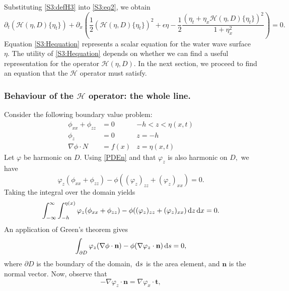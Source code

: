 \documentclass[11pt,reqno,oneside,a4paper]{article}
\begin{document}
Substituting \eqref{S3:defH3} into \eqref{S3:eq2}, we obtain 
\begin{equation}\label{S3:Hequation}
\partial_t\left(\mathcal{H}(\eta, D)\{ \eta_t\} \right) + \partial_x\left( \frac{1}{2}\left(\mathcal{H}(\eta, D)\{\eta_t\} \right)^2 + \epsilon \eta - \frac{1}{2} \frac{(\eta_t + \eta_x \mathcal{H}(\eta, D)\{ \eta_t\})^2}{1+\eta_x^2}\right) = 0.
\end{equation}
Equation \eqref{S3:Hequation} represents a scalar equation for the water wave surface $\eta.$ The utility of \eqref{S3:Hequation} depends on whether we can find a useful representation for the operator $\mathcal{H}(\eta, D).$ In the next section, we proceed to find an equation that the $\mathcal{H}$ operator must satisfy. 

\subsubsection{Behaviour of the $\mathcal{H}$ operator: the whole line.}
Consider the following boundary value problem:
\begin{subequations}
\begin{align}
\phi_{xx} + \phi_{zz} &= 0 &-h < z < \eta(x,t) \label{S3:PDE1}\\
\phi_{z} &= 0 &z = -h \label{S3:BBC}\\
\nabla  \phi \cdot N &= f(x )& z = \eta(x,t) \label{S3:KBC}
\end{align}
\end{subequations}
Let $\varphi$ be harmonic on $D.$ Using \eqref{PDEn} and that $\varphi_z$ is also harmonic on $D,$ we have
\[ \varphi_z(\phi_{xx} + \phi_{zz}) - \phi((\varphi_z)_{zz} + (\varphi_{z})_{xx}) = 0. \]
Taking the integral over the domain yields
\[ \int^{\infty}_{-\infty} \int^{\eta(x)}_{-h} \varphi_z(\phi_{xx} + \phi_{zz}) - \phi((\varphi_z)_{zz} + (\varphi_{z})_{xx}) \,\mathrm{d} z \,\mathrm{d} x = 0.\]
An application of Green's theorem gives 
\begin{equation}\label{S3:dInt}
\int_{\partial D} \varphi_z(\nabla  \phi \cdot \textbf{n}) - \phi(\nabla  \varphi_z \cdot \textbf{n}) \,\mathrm{d} s = 0,
\end{equation} 
where $\partial D$ is the boundary of the domain, $\,\mathrm{d} s$ is the area element, and $\textbf{n}$ is the normal vector. Now, observe that
\[- \nabla \varphi_z \cdot \textbf{n} = \nabla  \varphi_x \cdot \textbf{t}, \]
\end{document}
